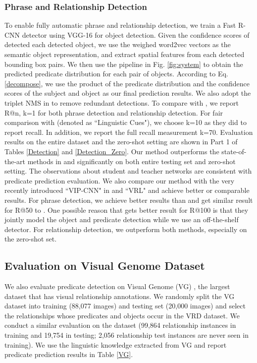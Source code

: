 \subsubsection{Phrase and Relationship Detection}
To enable fully automatic phrase and relationship detection, we train a Fast R-CNN detector \cite{fastRCNN} using VGG-16 for object detection. Given the confidence scores of detected each detected object, we use the weighed word2vec vectors as the semantic object representation, and extract spatial features from each detected bounding box pairs. We then use the pipeline in Fig. \ref{fig:system} to obtain the predicted predicate distribution for each pair of objects. According to Eq. \ref{decompose}, we use the product of the predicate distribution and the confidence scores of the subject and object as our final prediction results. We also adopt the triplet NMS in \cite{VIPCNN} to remove redundant detections. To compare with \cite{VRD}, we report R@n, k=1 for both phrase detection and relationship detection. For fair comparison with \cite{UIUC} (denoted as ``Linguistic Cues"), we choose k=10 as they did to report recall. In addition, we report the full recall measurement k=70. Evaluation results on the entire dataset and the zero-shot setting are shown in Part 1 of Tables \ref{Detection} and \ref{Detection_Zero}. Our method outperforms the state-of-the-art methods in \cite{VRD} and \cite{UIUC} significantly on both entire testing set and zero-shot setting. The observations about student and teacher networks are consistent with predicate prediction evaluation. 
We also compare our method with the very recently introduced ``VIP-CNN" in \cite{VIPCNN} and ``VRL" \cite{RL} and achieve better or comparable results. For phrase detection, we achieve better results than \cite{RL} and get similar result for R@50 to \cite{VIPCNN}. One possible reason that \cite{VIPCNN} gets better result for R@100 is that they jointly model the object and predicate detection while we use an off-the-shelf detector.
For relationship detection, we outperform both methods, especially on the zero-shot set.




\subsection{Evaluation on Visual Genome Dataset}
We also evaluate predicate detection on Visual Genome (VG) \cite{VG}, the largest dataset that has visual relationship annotations. We randomly split the VG dataset into training (88,077 images) and testing set (20,000 images) and select the relationships whose predicates and objects occur in the VRD dataset. We conduct a similar evaluation on the dataset (99,864 relationship instances in training and 19,754 in testing; 2,056 relationship test instances are never seen in training). We use the linguistic knowledge extracted from VG and report predicate prediction results in Table \ref{VG}. 

